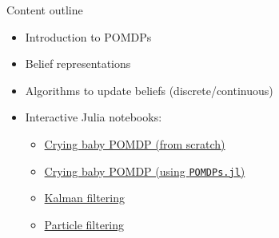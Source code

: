 \begin{frame}[fragile]{Content outline}

\begin{itemize}
    \item Introduction to POMDPs
    \item Belief representations
    \item Algorithms to update beliefs (discrete/continuous)
    \item Interactive Julia notebooks:
    \begin{itemize}
        \item \href{http://htmlview.glitch.me/?https://raw.githubusercontent.com/mossr/StateEstimation.jl/master/html/crying_baby_problem.html}{\color{cardinal}Crying baby POMDP (from scratch)}
        \item \href{https://htmlview.glitch.me/?https://github.com/JuliaAcademy/Decision-Making-Under-Uncertainty/blob/master/html/2-POMDPs.jl.html}{\color{cardinal}Crying baby POMDP (using \texttt{POMDPs.jl})}
        \item \href{http://htmlview.glitch.me/?https://raw.githubusercontent.com/mossr/StateEstimation.jl/master/html/kalman_filter.html}{\color{cardinal}Kalman filtering}
        \item \href{http://htmlview.glitch.me/?https://raw.githubusercontent.com/mossr/StateEstimation.jl/master/html/particle_filter.html}{\color{cardinal}Particle filtering}
    \end{itemize}
\end{itemize}

\end{frame}